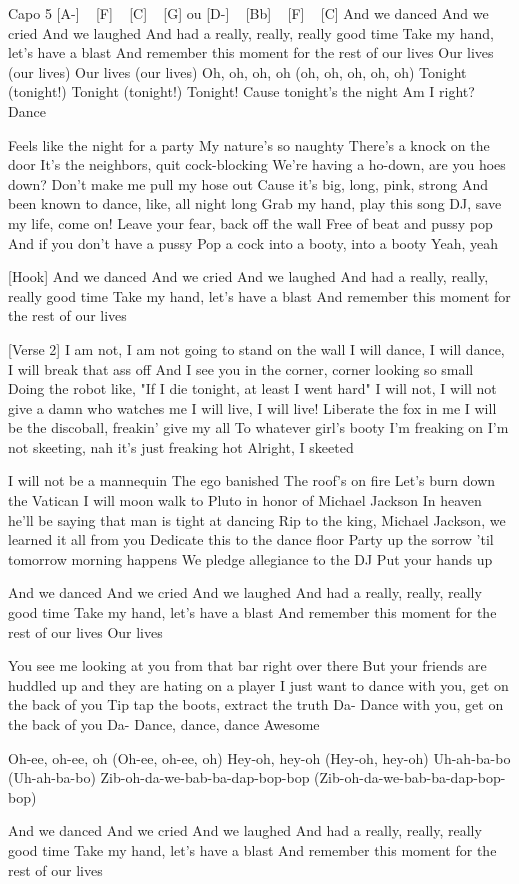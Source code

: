 Capo 5
[A-] ~ [F] ~ [C] ~ [G]
ou
[D-] ~ [Bb] ~ [F] ~ [C]
And we danced
And we cried
And we laughed
And had a really, really, really good time
Take my hand, let's have a blast
And remember this moment for the rest of our lives
Our lives (our lives)
Our lives (our lives)
Oh, oh, oh, oh (oh, oh, oh, oh, oh)
Tonight (tonight!)
Tonight (tonight!)
Tonight!
Cause tonight's the night
Am I right?
Dance

Feels like the night for a party
My nature's so naughty
There's a knock on the door
It's the neighbors, quit cock-blocking
We're having a ho-down, are you hoes down?
Don't make me pull my hose out
Cause it's big, long, pink, strong
And been known to dance, like, all night long
Grab my hand, play this song
DJ, save my life, come on!
Leave your fear, back off the wall
Free of beat and pussy pop
And if you don't have a pussy
Pop a cock into a booty, into a booty
Yeah, yeah

[Hook]
And we danced
And we cried
And we laughed
And had a really, really, really good time
Take my hand, let's have a blast
And remember this moment for the rest of our lives

[Verse 2]
I am not, I am not going to stand on the wall
I will dance, I will dance, I will break that ass off
And I see you in the corner, corner looking so small
Doing the robot like, "If I die tonight, at least I went hard"
I will not, I will not give a damn who watches me
I will live, I will live! Liberate the fox in me
I will be the discoball, freakin' give my all
To whatever girl's booty I'm freaking on
I'm not skeeting, nah it's just freaking hot
Alright, I skeeted

I will not be a mannequin
The ego banished
The roof's on fire
Let's burn down the Vatican
I will moon walk to Pluto in honor of Michael Jackson
In heaven he'll be saying that man is tight at dancing
Rip to the king, Michael Jackson, we learned it all from you
Dedicate this to the dance floor
Party up the sorrow 'til tomorrow morning happens
We pledge allegiance to the DJ
Put your hands up

And we danced
And we cried
And we laughed
And had a really, really, really good time
Take my hand, let's have a blast
And remember this moment for the rest of our lives
Our lives

You see me looking at you from that bar right over there
But your friends are huddled up and they are hating on a player
I just want to dance with you, get on the back of you
Tip tap the boots, extract the truth
Da- Dance with you, get on the back of you
Da- Dance, dance, dance
Awesome

Oh-ee, oh-ee, oh
(Oh-ee, oh-ee, oh)
Hey-oh, hey-oh
(Hey-oh, hey-oh)
Uh-ah-ba-bo
(Uh-ah-ba-bo)
Zib-oh-da-we-bab-ba-dap-bop-bop
(Zib-oh-da-we-bab-ba-dap-bop-bop)

And we danced
And we cried
And we laughed
And had a really, really, really good time
Take my hand, let's have a blast
And remember this moment for the rest of our lives